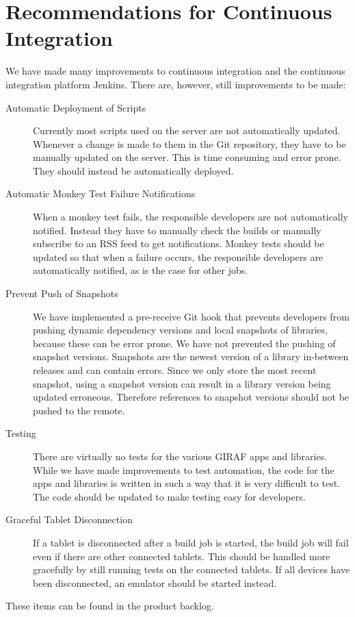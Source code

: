 \section{Recommendations for Continuous Integration}\label{sec:ci_recommendations}
We have made many improvements to continuous integration and the continuous integration platform Jenkins. There are, however, still improvements to be made:

\begin{description}
  \item[Automatic Deployment of Scripts] Currently most scripts used on the server are not automatically updated. Whenever a change is made to them in the Git repository, they have to be manually updated on the server. This is time consuming and error prone. They should instead be automatically deployed.
  \item[Automatic Monkey Test Failure Notifications] When a monkey test fails, the responsible developers are not automatically notified. Instead they have to manually check the builds or manually subscribe to an RSS feed to get notifications. Monkey tests should be updated so that when a failure occurs, the responsible developers are automatically notified, as is the case for other jobs.
  \item[Prevent Push of Snapshots] We have implemented a pre-receive Git hook that prevents developers from pushing dynamic dependency versions and local snapshots of libraries, because these can be error prone. We have not prevented the pushing of snapshot versions. Snapshots are the newest version of a library in-between releases and can contain errors. Since we only store the most recent snapshot, using a snapshot version can result in a library version being updated erroneous. Therefore references to snapshot versions should not be pushed to the remote.
  \item[Testing] There are virtually no tests for the various GIRAF apps and libraries. While we have made improvements to test automation, the code for the apps and libraries is written in such a way that it is very difficult to test. The code should be updated to make testing easy for developers.
  \item[Graceful Tablet Disconnection] If a tablet is disconnected after a build job is started, the build job will fail even if there are other connected tablets. This should be handled more gracefully by still running tests on the connected tablets. If all devices have been disconnected, an emulator should be started instead.
\end{description}

These items can be found in the product backlog.